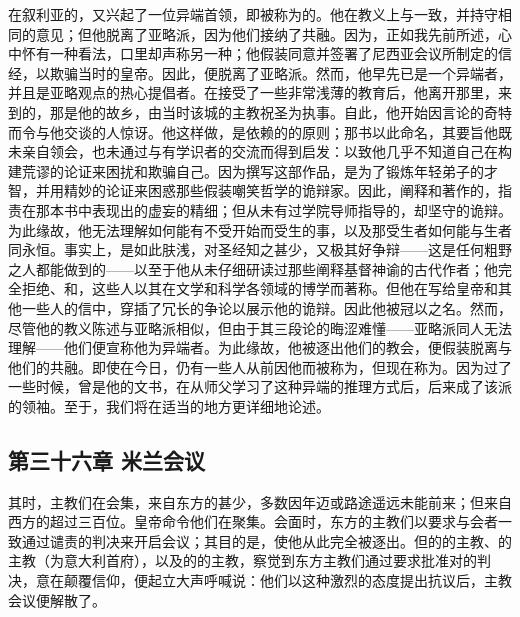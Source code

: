 在叙利亚的，又兴起了一位异端首领，即被称为的。他在教义上与一致，并持守相同的意见；但他脱离了亚略派，因为他们接纳了共融。因为，正如我先前所述，心中怀有一种看法，口里却声称另一种；他假装同意并签署了尼西亚会议所制定的信经，以欺骗当时的皇帝。因此，便脱离了亚略派。然而，他早先已是一个异端者，并且是亚略观点的热心提倡者。在接受了一些非常浅薄的教育后，他离开那里，来到的，那是他的故乡，由当时该城的主教祝圣为执事。自此，他开始因言论的奇特而令与他交谈的人惊讶。他这样做，是依赖的的原则；那书以此命名，其要旨他既未亲自领会，也未通过与有学识者的交流而得到启发：以致他几乎不知道自己在构建荒谬的论证来困扰和欺骗自己。因为撰写这部作品，是为了锻炼年轻弟子的才智，并用精妙的论证来困惑那些假装嘲笑哲学的诡辩家。因此，阐释和著作的，指责在那本书中表现出的虚妄的精细；但从未有过学院导师指导的，却坚守的诡辩。为此缘故，他无法理解如何能有不受开始而受生的事，以及那受生者如何能与生者同永恒。事实上，是如此肤浅，对圣经知之甚少，又极其好争辩——这是任何粗野之人都能做到的——以至于他从未仔细研读过那些阐释基督神谕的古代作者；他完全拒绝、和，这些人以其在文学和科学各领域的博学而著称。但他在写给皇帝和其他一些人的信中，穿插了冗长的争论以展示他的诡辩。因此他被冠以之名。然而，尽管他的教义陈述与亚略派相似，但由于其三段论的晦涩难懂——亚略派同人无法理解——他们便宣称他为异端者。为此缘故，他被逐出他们的教会，便假装脱离与他们的共融。即使在今日，仍有一些人从前因他而被称为，但现在称为。因为过了一些时候，曾是他的文书，在从师父学习了这种异端的推理方式后，后来成了该派的领袖。至于，我们将在适当的地方更详细地论述。\par


\subsection{第三十六章 米兰会议}

其时，主教们在会集，来自东方的甚少，多数因年迈或路途遥远未能前来；但来自西方的超过三百位。皇帝命令他们在聚集。会面时，东方的主教们以要求与会者一致通过谴责的判决来开启会议；其目的是，使他从此完全被逐出。但的的主教、的主教（为意大利首府），以及的的主教，察觉到东方主教们通过要求批准对的判决，意在颠覆信仰，便起立大声呼喊说：他们以这种激烈的态度提出抗议后，主教会议便解散了。\par

